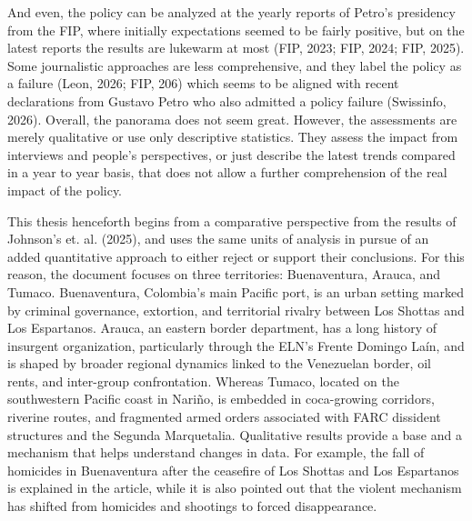 \documentclass[11pt]{article}
\begin{document}
And even, the policy can be analyzed at the yearly reports of Petro's presidency from the FIP, where initially expectations seemed to be fairly positive, but on the latest reports the results are lukewarm at most (FIP, 2023; FIP, 2024; FIP, 2025). Some journalistic approaches are less comprehensive, and they label the policy as a failure (Leon, 2026; FIP, 206) which seems to be aligned with recent declarations from Gustavo Petro who also admitted a policy failure (Swissinfo, 2026). Overall, the panorama does not seem great. However, the assessments are merely qualitative or use only descriptive statistics. They assess the impact from interviews and people's perspectives, or just describe the latest trends compared in a year to year basis, that does not allow a further comprehension of the real impact of the policy.

This thesis henceforth begins from a comparative perspective from the results of Johnson's et. al. (2025), and uses the same units of analysis in pursue of an added quantitative approach to either reject or support their conclusions. For this reason, the document focuses on three territories: Buenaventura, Arauca, and Tumaco. Buenaventura, Colombia's main Pacific port, is an urban setting marked by criminal governance, extortion, and territorial rivalry between Los Shottas and Los Espartanos. Arauca, an eastern border department, has a long history of insurgent organization, particularly through the ELN's Frente Domingo Laín, and is shaped by broader regional dynamics linked to the Venezuelan border, oil rents, and inter-group confrontation. Whereas Tumaco, located on the southwestern Pacific coast in Nariño, is embedded in coca-growing corridors, riverine routes, and fragmented armed orders associated with FARC dissident structures and the Segunda Marquetalia. Qualitative results provide a base and a mechanism that helps understand changes in data. For example, the fall of homicides in Buenaventura after the ceasefire of Los Shottas and Los Espartanos is explained in the article, while it is also pointed out that the violent mechanism has shifted from homicides and shootings to forced disappearance. 
\end{document}
